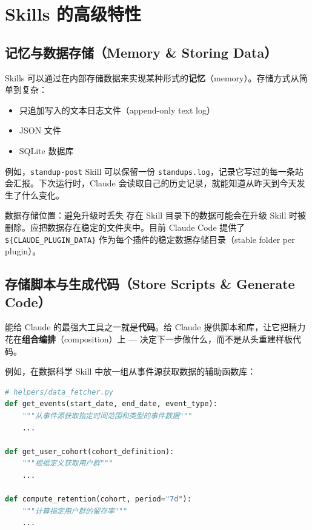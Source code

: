 \section{Skills 的高级特性}

\subsection{记忆与数据存储（Memory \& Storing Data）}

Skills 可以通过在内部存储数据来实现某种形式的\textbf{记忆}（memory）。存储方式从简单到复杂：
\begin{itemize}
    \item 只追加写入的文本日志文件（append-only text log）
    \item JSON 文件
    \item SQLite 数据库
\end{itemize}

例如，\texttt{standup-post} Skill 可以保留一份 \texttt{standups.log}，记录它写过的每一条站会汇报。下次运行时，Claude 会读取自己的历史记录，就能知道从昨天到今天发生了什么变化。

\begin{warningbox}{数据存储位置：避免升级时丢失}
存在 Skill 目录下的数据可能会在升级 Skill 时被删除。应把数据存在稳定的文件夹中。目前 Claude Code 提供了 \texttt{\$\{CLAUDE\_PLUGIN\_DATA\}} 作为每个插件的稳定数据存储目录（stable folder per plugin）。
\end{warningbox}

\subsection{存储脚本与生成代码（Store Scripts \& Generate Code）}

能给 Claude 的最强大工具之一就是\textbf{代码}。给 Claude 提供脚本和库，让它把精力花在\textbf{组合编排}（composition）上 --- 决定下一步做什么，而不是从头重建样板代码。

例如，在数据科学 Skill 中放一组从事件源获取数据的辅助函数库：

\begin{lstlisting}[caption={Skill 中辅助函数库示例：数据获取与分析},language=Python]
# helpers/data_fetcher.py
def get_events(start_date, end_date, event_type):
    """从事件源获取指定时间范围和类型的事件数据"""
    ...

def get_user_cohort(cohort_definition):
    """根据定义获取用户群"""
    ...

def compute_retention(cohort, period="7d"):
    """计算指定用户群的留存率"""
    ...
\end{lstlisting}

